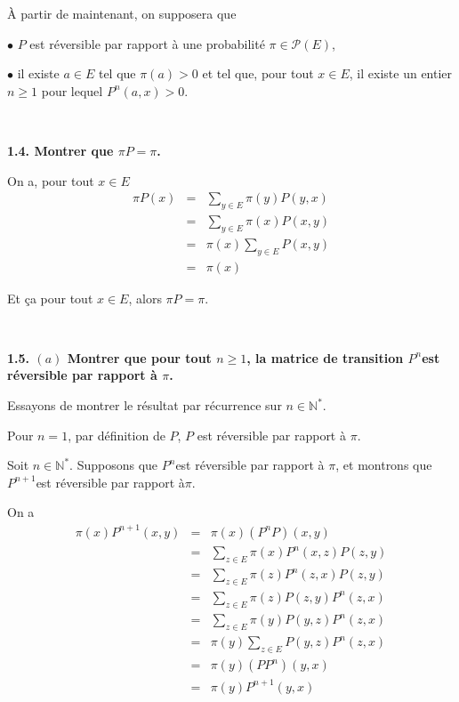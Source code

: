 {\`A} partir de maintenant, on supposera que

$\bullet$ $P$ est r{\'e}versible par rapport {\`a} une probabilit{\'e} $\pi
\in \mathcal{P}(E)$,

$\bullet$ il existe $a \in E$ tel que $\pi (a) > 0$ et tel que, pour tout $x
\in E$, il existe un entier$n \geqslant 1$ pour lequel $P^n (a, x) > 0.$

\

\textbf{1.4. Montrer que $\pi P = \pi$.}

On a, pour tout $x \in E$
\begin{eqnarray*}
  \pi P (x) & = & \underset{y \in E}{\sum} \pi (y) P (y, x)\\
  & = & \underset{y \in E}{\sum} \pi (x) P (x, y)\\
  & = & \pi (x) \underset{y \in E}{\sum} P (x, y)\\
  & = & \pi (x)
\end{eqnarray*}


Et {\c c}a pour tout $x \in E$, alors $\pi P = \pi$.

\

\textbf{1.5. $(a)$ Montrer que pour tout $n \geqslant 1$, la matrice
de transition $P^n $est r{\'e}versible par rapport {\`a} $\pi$.}

Essayons de montrer le r{\'e}sultat par r{\'e}currence sur $n \in
\mathbb{N}^{\ast}$.

Pour $n = 1$, par d{\'e}finition de $P$, $P$ est r{\'e}versible par rapport
{\`a} $\pi$.

Soit $n \in \mathbb{N}^{\ast}$. Supposons que $P^n $est r{\'e}versible par
rapport {\`a} $\pi$, et montrons que $P^{n + 1} $est r{\'e}versible par
rapport {\`a}$\pi$.

On a
\begin{eqnarray*}
  \pi (x) P^{n + 1} (x, y) & = & \pi (x) (P^n P) (x, y)\\
  & = & \underset{z \in E}{\sum} \pi (x) P^n (x, z) P (z, y)\\
  & = & \underset{z \in E}{\sum} \pi (z) P^n (z, x) P (z, y)\\
  & = & \underset{z \in E}{\sum} \pi (z) P (z, y) P^n (z, x)\\
  & = & \underset{z \in E}{\sum} \pi (y) P (y, z) P^n (z, x)\\
  & = & \pi (y) \underset{z \in E}{\sum} P (y, z) P^n (z, x)\\
  & = & \pi (y) (P P^n) (y, x)\\
  & = & \pi (y) P^{n + 1} (y, x)
\end{eqnarray*}


